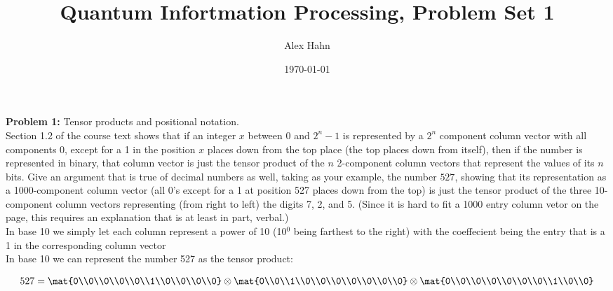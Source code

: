 
\setlength{\parindent}{0pt}

\title{Quantum Infortmation Processing, Problem Set 1}
\author{Alex Hahn}
\date{\today}
\maketitle

\textbf{Problem 1:} Tensor products and positional notation.\\

Section 1.2 of the course text shows that if an integer $x$ between 0 and
$2^n-1$ is represented by a $2^n$ component column vector with all components 0,
except for a 1 in the position $x$ places down from the top place (the top
places down from itself), then if the number is represented in binary, that
column vector is just the tensor product of the $n$ 2-component column vectors
that represent the values of its $n$ bits. Give an argument that is true of
decimal numbers as well, taking as your example, the number $527$, showing that
its representation as a 1000-component column vector (all 0's except for a 1 at
position 527 places down from the top) is just the tensor product of the three
10-component column vectors representing (from right to left) the digits 7, 2,
and 5. (Since it is hard to fit a 1000 entry column vetor on the page, this
requires an explanation that is at least in part, verbal.)\\

In base 10 we simply let each column represent a power of 10
(10$^0$ being farthest to the right) with the coeffecient being the entry that
is a 1 in the corresponding column vector\\


In base 10 we can represent the number 527 as the tensor product:

$$527=\mat{0\\0\\0\\0\\0\\1\\0\\0\\0\\0}\otimes\mat{0\\0\\1\\0\\0\\0\\0\\0\\0\\0}\otimes\mat{0\\0\\0\\0\\0\\0\\0\\1\\0\\0}$$

